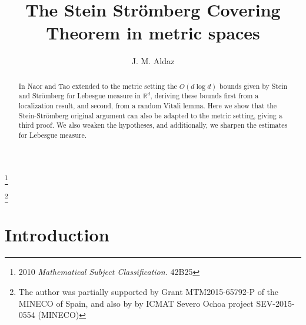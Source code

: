 \documentclass[12pt]{amsart}
\theoremstyle{definition}
\theoremstyle{parrafo}
\begin{document}
\title[]{The Stein Str\"omberg Covering Theorem in metric spaces}

\author{J. M. Aldaz}
\address{Instituto de Ciencias Matem\'aticas (CSIC-UAM-UC3M-UCM) and Departamento de 
Matem\'aticas,
Universidad  Aut\'onoma de Madrid, Cantoblanco 28049, Madrid, Spain.}

\thanks{2010 {\em Mathematical Subject Classification.} 42B25}

\thanks{The author was partially supported by Grant MTM2015-65792-P of the
MINECO of Spain, and also by by ICMAT Severo Ochoa project SEV-2015-0554 (MINECO)}











\begin{abstract} In \cite{NaTa} Naor and Tao extended to the metric setting the $O(d \log d)$ 
bounds given by Stein and Str\"omberg for Lebesgue measure in 
$\mathbb{R}^d$, deriving these bounds first from a localization result, and second, from  a
random Vitali lemma. Here we show that the Stein-Str\"omberg original argument
can also be adapted to the metric setting, giving a third proof. 
We also weaken the hypotheses, and 
additionally, we sharpen the
estimates for Lebesgue measure.
\end{abstract}




\maketitle






\section {Introduction} 
\end{document}
